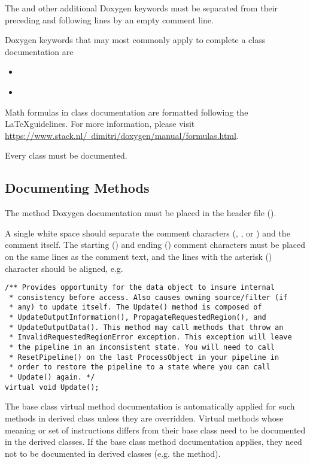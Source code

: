 The  and other additional Doxygen keywords must be separated from
their preceding and following lines by an empty comment \code{*} line.

Doxygen keywords that may most commonly apply to complete a class documentation are
\begin{itemize}
  \item \textbf{}
  \item \textbf{}
\end{itemize}

Math formulas in class documentation are formatted following the \LaTeX guidelines.
For more information, please visit
\href{https://www.stack.nl/~dimitri/doxygen/manual/formulas.html}
{https://www.stack.nl/~dimitri/doxygen/manual/formulas.html}.

Every class must be documented.


\subsection{Documenting Methods}
\label{subsec:DocumentingMethods}

The method Doxygen documentation must be placed in the header file ().

A single white space should separate the comment characters (\code{/**},
\code{*}, or \code{*/}) and the comment itself. The starting (\code{/**})
and ending (\code{*/}) comment characters must be placed on the same lines
as the comment text, and the lines with the asterisk (\code{*}) character
should be aligned, e.g.

\small
\begin{verbatim}
/** Provides opportunity for the data object to insure internal
 * consistency before access. Also causes owning source/filter (if
 * any) to update itself. The Update() method is composed of
 * UpdateOutputInformation(), PropagateRequestedRegion(), and
 * UpdateOutputData(). This method may call methods that throw an
 * InvalidRequestedRegionError exception. This exception will leave
 * the pipeline in an inconsistent state. You will need to call
 * ResetPipeline() on the last ProcessObject in your pipeline in
 * order to restore the pipeline to a state where you can call
 * Update() again. */
virtual void Update();
\end{verbatim}
\normalsize

The base class virtual method documentation is automatically applied for such
methods in derived class unless they are overridden. Virtual methods whose
meaning or set of instructions differs from their base class need to be
documented in the derived classes. If the base class method documentation
applies, they need not to be documented in derived classes (e.g. the
 method).

